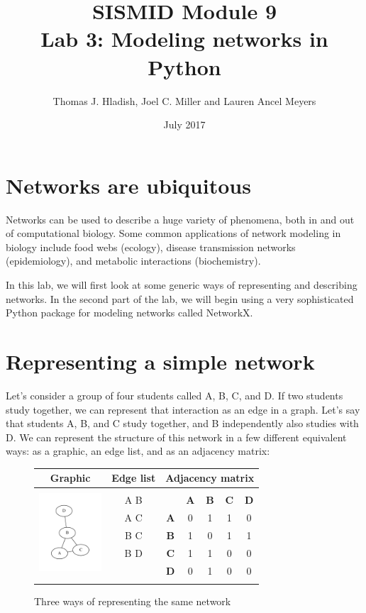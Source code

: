 \documentclass{article}
\begin{document}
\title{SISMID Module 9\\Lab 3: Modeling networks in Python}
\author{Thomas J. Hladish, Joel C. Miller and Lauren Ancel Meyers}
\date{July 2017}
\maketitle


\section*{Networks are ubiquitous}
Networks can be used to describe a huge variety of phenomena, both in and out of computational biology.  
Some common applications of network modeling in biology include food webs (ecology), disease transmission networks (epidemiology), 
and metabolic interactions (biochemistry).

In this lab, we will first look at some generic ways of representing and describing networks.  In the second part of the lab, we will
 begin using a very sophisticated Python package for modeling networks called NetworkX.

\section*{Representing a simple network}
Let's consider a group of four students called A, B, C, and D.  If two students study together, we can represent that interaction as an
 edge in a graph.  Let's say that students A, B, and C study together, and B independently also studies with D.  We can represent the 
structure of this network in a few different equivalent ways: as a graphic, an edge list, and as an adjacency matrix:

\UndefineShortVerb{\|}
\begin{figure}[h]
\begin{center}
\begin{tabular}{|c|c|c c c c c|}
\hline
\textbf{Graphic}	&\textbf{Edge list}	&\multicolumn{5}{|c|}{\textbf{Adjacency matrix}}	\\ \hline

\multirow{6}{*}{\includegraphics[trim = .4in .4in .4in .4in, clip, height=1.15in]{7_sampleABC.pdf}} &&&&&& \\
& A B & & \textbf{A} & \textbf{B} & \textbf{C} & \textbf{D} \\
& A C & \textbf{A} & 0 & 1 & 1 & 0\\
& B C & \textbf{B} & 1 & 0 & 1 & 1\\
& B D & \textbf{C} & 1 & 1 & 0 & 0\\
& & \textbf{D} & 0 & 1 & 0 & 0\\
&&&&&&\\
\hline
\end{tabular}
\caption{Three ways of representing the same network}
\end{center}
\end{figure}
\end{document}
